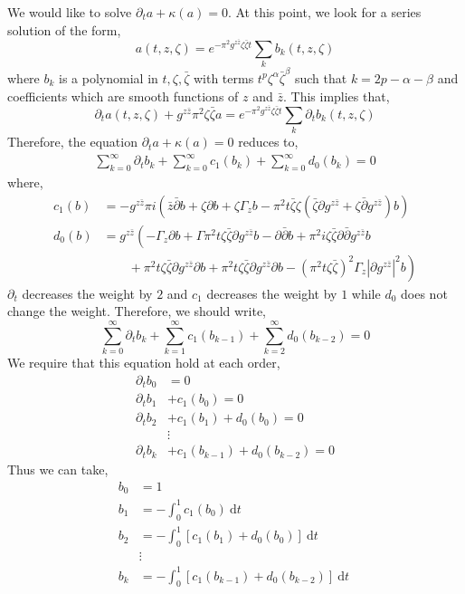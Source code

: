 \documentclass[12pt]{extarticle}
\renewcommand{\d}[1]{\: \mathrm{d}#1 \:}
\theoremstyle{definition}
\begin{document}
We would like to solve $\partial_t a + \kappa(a) = 0$. At this point, we look for a series solution of the form,
\[ a(t, z, \zeta) = e^{- \pi^2 g^{z \bar{z}} \zeta \bar{\zeta} t} \sum_{k} b_k(t, z, \zeta) \]
where $b_k$ is a polynomial in $t, \zeta, \bar{\zeta}$ with terms $t^p \zeta^{\alpha} \bar{\zeta}^{\beta}$ such that $k = 2p - \alpha - \beta$ and coefficients which are smooth functions of $z$ and $\bar{z}$. This implies that,
\[ \partial_t a(t, z, \zeta) + g^{z \bar{z}} \pi^2 \zeta \bar{\zeta} a = e^{- \pi^2 g^{z \bar{z}} \zeta \bar{\zeta} t} \sum_{k} \partial_t b_k(t, z, \zeta) \]
Therefore, the equation $\partial_t a + \kappa(a) = 0$ reduces to,
\begin{align*}
\sum_{k = 0}^{\infty} \partial_t b_k + \sum_{k = 0}^{\infty} c_1(b_k) + \sum_{k = 0}^{\infty} d_0(b_k) = 0 
\end{align*}
where,
\begin{align*}
c_1(b) & = -g^{z \bar{z}} \pi i \left( \bar{z} \bar{\partial} b + \zeta \partial b + \zeta \Gamma_{z} b - \pi^2 t \bar{\zeta} \zeta \left(\bar{\zeta} \partial g^{z \bar{z}} + \zeta \bar{\partial} g^{z \bar{z}} \right) b \right)
\\
d_0(b) & = g^{z \bar{z}} \left( - \Gamma_z \partial b + \Gamma \pi^2 t \zeta \bar{\zeta} \partial g^{z \bar{z}} b - \partial \bar{\partial} b + \pi^2 i \zeta \bar{\zeta} \partial \bar{\partial} g^{z \bar{z}} b 
\right.
\\
& \left. \quad \quad + \pi^2 t \zeta \bar{\zeta} \partial g^{z \bar{z}} \partial b + \pi^2 t \zeta \bar{\zeta} \partial g^{z \bar{z}} \partial b -  (\pi^2 t \zeta \bar{\zeta} )^2 \Gamma_z | \partial g^{z \bar{z}} |^2 b \right)
\end{align*}
$\partial_t$ decreases the weight by $2$ and $c_1$ decreases the weight by $1$ while $d_0$ does not change the weight. Therefore, we should write,
\[ \sum_{k = 0}^{\infty} \partial_t b_k + \sum_{k = 1}^{\infty} c_1(b_{k-1}) + \sum_{k = 2}^{\infty} d_0(b_{k-2}) = 0 \]
We require that this equation hold at each order,
\begin{align*}
\partial_t b_0 & = 0
\\
\partial_t b_1 & + c_1(b_0) = 0
\\
\partial_t b_2 & + c_1(b_1) + d_0(b_0) = 0
\\
& \vdots
\\
\partial_t b_k & + c_1(b_{k-1}) + d_0(b_{k-2}) = 0
\end{align*}
Thus we can take,
\begin{align*}
b_0 & = 1
\\
b_1 & = -\int_0^1 c_1(b_0) \d{t}
\\
b_2 & = - \int_0^1 [c_1(b_1) + d_0(b_0)] \d{t}
\\
& \vdots
\\
b_k & = - \int_0^1 [c_1(b_{k-1}) + d_0(b_{k-2})] \d{t}
\end{align*}
\end{document}
